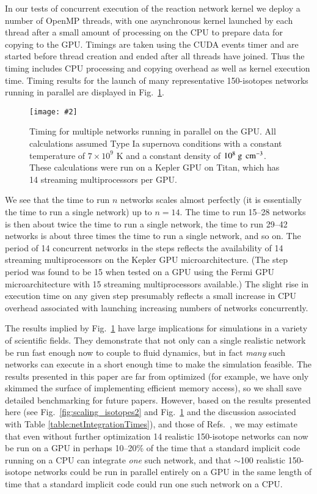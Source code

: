 \documentclass[]{elsart}
\newlength{\figdn}
\newcommand{\fig}[1]{Fig.~\ref{fig:#1}}
\newcommand{\units}[1]{\mbox{\ #1}}
\newcommand{\singlefig}[6]{%
\begin{figure} \vspace{#3}%
\begin{flushright}%
\texttt{[image: \#2]}%
\end{flushright}%
\caption{\label{fig:#1} #6}%
\vspace{#4}%
\end{figure}}
\begin{document}
In our tests of concurrent execution of the reaction network kernel we deploy a 
number of OpenMP threads, with one asynchronous kernel launched by each thread 
after a small amount of processing  on the CPU to prepare data for 
copying to the GPU.  Timings are taken using the CUDA events timer and are 
started before thread creation and ended after all threads have joined. Thus the 
timing includes CPU processing and copying overhead as well as kernel execution 
time. Timing results for the launch of many representative 150-isotopes networks 
running in parallel are displayed in \fig{stackedNetworkTiming}.%
%
%
\singlefig
{stackedNetworkTiming}
{figures/stackedNetworkTiming.eps}
{0pt}
{\figdn}
{0.55}
{Timing for multiple networks running in parallel on the GPU. All calculations 
assumed Type Ia supernova conditions with a constant temperature of $7\times 
10^9$ K and a constant density of $10^8 \units{g\, cm}^{-3}$.  These 
calculations were run on a Kepler GPU on Titan, which has 14 streaming 
multiprocessors per GPU.}
%
%
We see that the time to run $n$ networks scales almost perfectly (it is 
essentially the time to run a single network) up to $n=14$. The time to run 
15--28 networks is then about twice the time to run a single network, the time 
to run 29--42 networks is about three times the time to run a single network, 
and so on.  The period of 14 concurrent networks in the steps reflects the 
availability of 14 streaming multiprocessors on the Kepler GPU 
microarchitecture.  (The step period was found to be 15 when tested on a GPU 
using the Fermi GPU microarchitecture with 15 streaming multiprocessors 
available.)  The slight rise in execution time on any given step presumably 
reflects a small increase in CPU overhead associated with launching increasing 
numbers of networks concurrently.

The results implied by \fig{stackedNetworkTiming} have large implications for 
simulations in a variety of scientific fields.  They demonstrate that not only 
can a single realistic network be run fast enough now to couple to fluid 
dynamics, but in fact {\em many} such networks can execute in a short enough 
time to make the simulation feasible.  The results presented in this paper are 
far from optimized (for example, we have only skimmed the surface of 
implementing efficient memory access), so we shall save detailed benchmarking 
for future papers.  However, based on the results presented here (see 
\fig{scaling_isotopes2} and \fig{stackedNetworkTiming} and the discussion associated with
Table \ref{table:netIntegrationTimes}), and those of Refs.\ 
\cite{guidJCP,guidAsy,guidQSS,guidPE}, we may estimate that even without 
further optimization 14 realistic 150-isotope networks can now be run  on a 
GPU in perhaps 10--20\% of the time that a standard implicit code running on a 
CPU can integrate {\em one} such network, and that $\sim$100 realistic 
150-isotope networks could be run in parallel entirely on a GPU in the same 
length of time that a standard implicit code could run one such network on a 
CPU.
\end{document}
